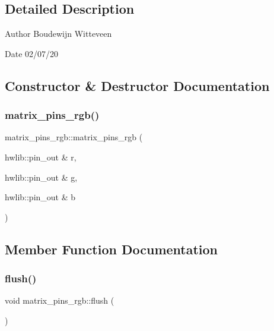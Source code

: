 \subsection{Detailed Description}
\begin{DoxyAuthor}{Author}
Boudewijn Witteveen 
\end{DoxyAuthor}
\begin{DoxyDate}{Date}
02/07/20 
\end{DoxyDate}


\subsection{Constructor \& Destructor Documentation}
\mbox{\label{classmatrix__pins__rgb_ac02033d27280314ad8e1d6b4b9b4c2cf}} 
\subsubsection{\texorpdfstring{matrix\+\_\+pins\+\_\+rgb()}{matrix\_pins\_rgb()}}
{\footnotesize\ttfamily matrix\+\_\+pins\+\_\+rgb\+::matrix\+\_\+pins\+\_\+rgb (\begin{DoxyParamCaption}\item[{hwlib\+::pin\+\_\+out \&}]{r,  }\item[{hwlib\+::pin\+\_\+out \&}]{g,  }\item[{hwlib\+::pin\+\_\+out \&}]{b }\end{DoxyParamCaption})\hspace{0.3cm}{\ttfamily [inline]}}



\subsection{Member Function Documentation}
\mbox{\label{classmatrix__pins__rgb_a79174576ae97424811a431bfec08c72c}} 
\subsubsection{\texorpdfstring{flush()}{flush()}}
{\footnotesize\ttfamily void matrix\+\_\+pins\+\_\+rgb\+::flush (\begin{DoxyParamCaption}{ }\end{DoxyParamCaption})\hspace{0.3cm}{\ttfamily [inline]}}





